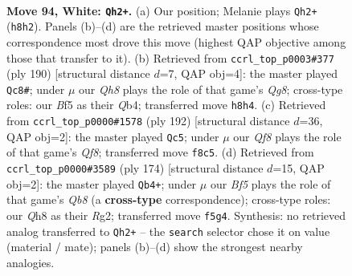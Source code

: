 \documentclass[11pt]{article}
\begin{document}
\clearpage

\begin{figure}[p]\centering
\begin{subfigure}{0.46\textwidth}\centering
\resizebox{\linewidth}{!}{%
\newchessgame
\chessboard[
  setfen={3R1Q1Q/8/8/5B2/8/6k1/8/7K w - - 1 94},
  showmover=false,
  pgfstyle=straightmove, color=movearrow, markmove={h8-h2}
]}
\caption{}
\end{subfigure}\hfill
\begin{subfigure}{0.46\textwidth}\centering
\resizebox{\linewidth}{!}{%
\newchessgame
\chessboard[
  setfen={R5QQ/2k5/8/8/1Q6/8/6K1/8 w - - 3 96},
  showmover=false,
  pgfstyle=straightmove, color=movearrow, markmove={g8-c8}
]}
\caption{}
\end{subfigure}
\\[4pt]
\begin{subfigure}{0.46\textwidth}\centering
\resizebox{\linewidth}{!}{%
\newchessgame
\chessboard[
  setfen={4QQ2/8/8/8/8/3k2K1/8/8 w - - 1 97},
  showmover=false,
  pgfstyle=straightmove, color=movearrow, markmove={f8-c5}
]}
\caption{}
\end{subfigure}\hfill
\begin{subfigure}{0.46\textwidth}\centering
\resizebox{\linewidth}{!}{%
\newchessgame
\chessboard[
  setfen={QQ6/8/8/2k5/8/8/2K3R1/8 w - - 1 88},
  showmover=false,
  pgfstyle=straightmove, color=movearrow, markmove={b8-b4}
]}
\caption{}
\end{subfigure}
\caption{\textbf{Move 94, White: \texttt{Qh2+}.} (a) Our position; Melanie plays \texttt{Qh2+} (\texttt{h8h2}). Panels (b)--(d) are the retrieved master positions whose correspondence most drove this move (highest QAP objective among those that transfer to it). (b) Retrieved from \texttt{ccrl\_top\_p0003\#377} (ply 190) [structural distance $d$=7, QAP obj=4]: the master played \texttt{Qc8\#}; under $\mu$ our \emph{Qh8} plays the role of that game's \emph{Qg8}; cross-type roles: our \emph{B}f5 as their \emph{Q}b4; transferred move \texttt{h8h4}. (c) Retrieved from \texttt{ccrl\_top\_p0000\#1578} (ply 192) [structural distance $d$=36, QAP obj=2]: the master played \texttt{Qc5}; under $\mu$ our \emph{Qf8} plays the role of that game's \emph{Qf8}; transferred move \texttt{f8c5}. (d) Retrieved from \texttt{ccrl\_top\_p0000\#3589} (ply 174) [structural distance $d$=15, QAP obj=2]: the master played \texttt{Qb4+}; under $\mu$ our \emph{Bf5} plays the role of that game's \emph{Qb8} (a \textbf{cross-type} correspondence); cross-type roles: our \emph{Q}h8 as their \emph{R}g2; transferred move \texttt{f5g4}. Synthesis: no retrieved analog transferred to \texttt{Qh2+} -- the \texttt{search} selector chose it on value (material / mate); panels (b)--(d) show the strongest nearby analogies.}
\label{fig:thought-m186}
\end{figure}
\end{document}
